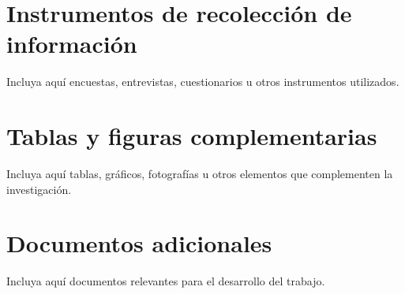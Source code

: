 \documentclass[12pt,a4paper]{article}
\begin{document}
\newpage
\printbibliography[
    heading=bibintoc,
    title={Referencias}
]

\newpage
\appendix

\section{Instrumentos de recolección de información}

Incluya aquí encuestas, entrevistas, cuestionarios u otros instrumentos utilizados.

\section{Tablas y figuras complementarias}

Incluya aquí tablas, gráficos, fotografías u otros elementos que complementen la investigación.

\section{Documentos adicionales}

Incluya aquí documentos relevantes para el desarrollo del trabajo.
\end{document}

